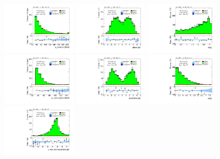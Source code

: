 \clearpage
\begin{figure}[tp]
  \includegraphics[width=0.32\textwidth]{figures/analysis/vbf-SSXCR/jet-1-pt}
  \includegraphics[width=0.32\textwidth]{figures/analysis/vbf-SSXCR/jet-1-eta}
  \includegraphics[width=0.32\textwidth]{figures/analysis/vbf-SSXCR/jets-dphi}
  \includegraphics[width=0.32\textwidth]{figures/analysis/vbf-SSXCR/jet-2-pt}
  \includegraphics[width=0.32\textwidth]{figures/analysis/vbf-SSXCR/jet-2-eta}
  \includegraphics[width=0.32\textwidth]{figures/analysis/vbf-SSXCR/jets-deta}
  \includegraphics[width=0.32\textwidth]{figures/analysis/vbf-SSXCR/jets-etaprod}

\end{figure}

